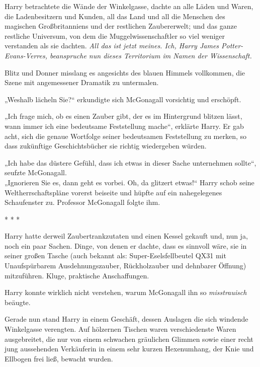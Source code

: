 {Harry betrachtete die Wände der Winkelgasse, dachte an alle Läden und Waren, die Ladenbesitzern und Kunden, all das Land und all die Menschen des magischen Großbritanniens und der restlichen Zaubererwelt; und das ganze restliche Universum, von dem die Muggelwissenschaftler so viel weniger verstanden als sie dachten. \emph{All das ist jetzt meines. Ich, Harry James Potter-Evans-Verres, beanspruche nun dieses Territorium im Namen der Wissenschaft.}

Blitz und Donner misslang es angesichts des blauen Himmels vollkommen, die Szene mit angemessener Dramatik zu untermalen.

„Weshalb lächeln Sie?“ erkundigte sich McGonagall vorsichtig und erschöpft.

„Ich frage mich, ob es einen Zauber gibt, der es im Hintergrund blitzen lässt, wann immer ich eine bedeutsame Feststellung mache“, erklärte Harry. Er gab acht, sich die genaue Wortfolge seiner bedeutsamen Feststellung zu merken, so dass zukünftige Geschichtsbücher sie richtig wiedergeben würden.

„Ich habe das düstere Gefühl, dass ich etwas in dieser Sache unternehmen sollte“, seufzte McGonagall.\\ „Ignorieren Sie es, dann geht es vorbei. Oh, da glitzert etwas!“ Harry schob seine Weltherrschaftspläne vorerst beiseite und hüpfte auf ein nahegelegenes Schaufenster zu. Professor McGonagall folgte ihm.

* * *

Harry hatte derweil Zaubertrankzutaten und einen Kessel gekauft und, nun ja, noch ein paar Sachen. Dinge, von denen er dachte, dass es sinnvoll wäre, sie in seiner großen Tasche (auch bekannt als: Super-Eselsfellbeutel QX31 mit Unaufspürbarem Ausdehnungszauber, Rückholzauber und dehnbarer Öffnung) mitzuführen. Kluge, praktische Anschaffungen.

Harry konnte wirklich nicht verstehen, warum McGonagall ihn so \emph{misstrauisch} beäugte.

Gerade nun stand Harry in einem Geschäft, dessen Auslagen die sich windende Winkelgasse verengten. Auf hölzernen Tischen waren verschiedenste Waren ausgebreitet, die nur von einem schwachen gräulichen Glimmen sowie einer recht jung aussehenden Verkäuferin in einem sehr kurzen Hexenumhang, der Knie und Ellbogen frei ließ, bewacht wurden.

}
